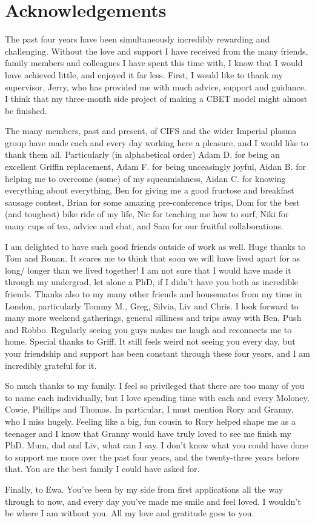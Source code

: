 \chapter*{Acknowledgements}

The past four years have been simultaneously incredibly rewarding and challenging.
Without the love and support I have received from the many friends, family members and colleagues I have spent this time with, I know that I would have achieved little, and enjoyed it far less.
First, I would like to thank my supervisor, Jerry, who has provided me with much advice, support and guidance.
I think that my three-month side project of making a CBET model might almost be finished.

The many members, past and present, of CIFS and the wider Imperial plasma group have made each and every day working here a pleasure, and I would like to thank them all.
Particularly (in alphabetical order) Adam D. for being an excellent Griffin replacement, Adam F. for being unceasingly joyful, Aidan B. for helping me to overcome (some) of my squeamishness, Aidan C. for knowing everything about everything, Ben for giving me a good fructose and breakfast sausage contest, Brian for some amazing pre-conference trips, Dom for the best (and toughest) bike ride of my life, Nic for teaching me how to surf, Niki for many cups of tea, advice and chat, and Sam for our fruitful collaborations.

I am delighted to have such good friends outside of work as well.
Huge thanks to Tom and Ronan.
It scares me to think that soon we will have lived apart for as long/ longer than we lived together!
I am not sure that I would have made it through my undergrad, let alone a PhD, if I didn't have you both as incredible friends.
Thanks also to my many other friends and housemates from my time in London, particularly Tommy M., Greg, Silvia, Liv and Chris.
I look forward to many more weekend gatherings, general silliness and trips away with Ben, Push and Robbo.
Regularly seeing you guys makes me laugh and reconnects me to home.
Special thanks to Griff.
It still feels weird not seeing you every day, but your friendship and support has been constant through these four years, and I am incredibly grateful for it.

So much thanks to my family.
I feel so privileged that there are too many of you to name each individually, but I love spending time with each and every Moloney, Cowie, Phillips and Thomas.
In particular, I must mention Rory and Granny, who I miss hugely.
Feeling like a big, fun cousin to Rory helped shape me as a teenager and I know that Granny would have truly loved to see me finish my PhD. 
Mum, dad and Liv, what can I say.
I don't know what you could have done to support me more over the past four years, and the twenty-three years before that.
You are the best family I could have asked for.

Finally, to Ewa.
You've been by my side from first applications all the way through to now, and every day you've made me smile and feel loved.
I wouldn't be where I am without you.
All my love and gratitude goes to you.
